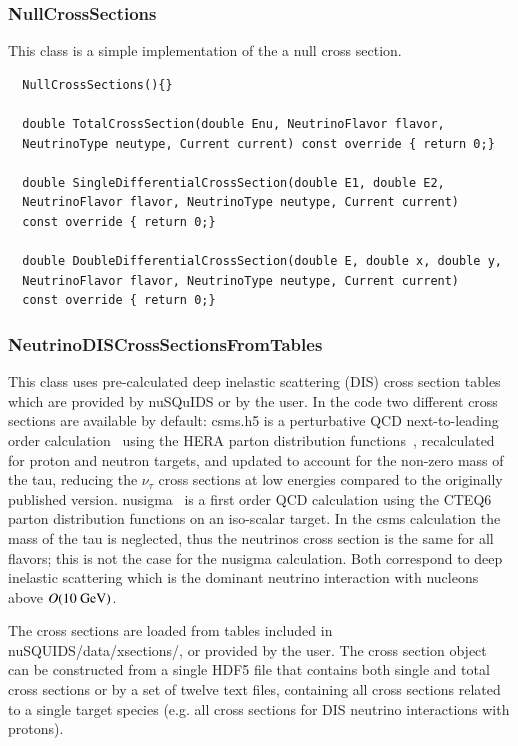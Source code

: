 \documentclass[3p,12pt]{elsarticle}
\newcommand{\ttf}{\ttfamily}
\begin{document}
\subsubsection{NullCrossSections\label{sec:null_cross_section}}
This class is a simple implementation of the a null cross section.
\begin{lstlisting}
  NullCrossSections(){}

  double TotalCrossSection(double Enu, NeutrinoFlavor flavor,
  NeutrinoType neutype, Current current) const override { return 0;}

  double SingleDifferentialCrossSection(double E1, double E2,
  NeutrinoFlavor flavor, NeutrinoType neutype, Current current)
  const override { return 0;}
  
  double DoubleDifferentialCrossSection(double E, double x, double y,
  NeutrinoFlavor flavor, NeutrinoType neutype, Current current)
  const override { return 0;}
\end{lstlisting}



\subsubsection{NeutrinoDISCrossSectionsFromTables\label{sec:neutrino_cross_section_from_tables}}

This class uses pre-calculated deep inelastic scattering (DIS) cross section tables
which are provided by {\ttf nuSQuIDS} or by the user. 
In the code two different cross sections are available by default:
{\ttf csms.h5} is a perturbative QCD next-to-leading order calculation~\cite{CooperSarkar:2011pa} using the HERA
parton distribution functions~\cite{Chekanov:2002pv}, recalculated for proton and neutron targets, 
and updated to account for the non-zero mass of the tau, reducing the $\nu_\tau$ 
cross sections at low energies compared to the originally published version. 
{\ttf nusigma}~\cite{nusigma} is a first order QCD
calculation using the {\ttf CTEQ6} parton distribution functions on an
iso-scalar target. In the {\ttf csms} calculation the mass of the tau
is neglected, thus the neutrinos cross section is the same for all
flavors; this is not the case for the {\ttf nusigma} calculation.
Both correspond to deep inelastic scattering which is the dominant
neutrino interaction with nucleons above $O({\rm 10~GeV})$. 

The cross sections are loaded from tables included in
{\ttfamily nuSQUIDS/data/xsections/}, or provided by the user. 
The cross section object can be constructed from a single {\ttf HDF5}
file that contains both single and total cross sections or by a set of
twelve text files, containing all cross sections related to a single target species 
(e.g. all cross sections for DIS neutrino interactions with protons). 
\end{document}
